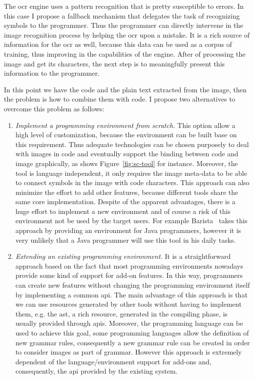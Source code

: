 The \gls{ocr} engine uses a pattern recognition that is pretty susceptible to errors. In this case I propose a fallback mechanism that delegates the task of recognizing symbols to the programmer. Thus the programmer can directly intervene in the image recognition process by helping the \gls{ocr} upon a mistake. It is a rich source of information for the \gls{ocr} as well, because this data can be used as a corpus of training, thus improving  in the capabilities of the engine. After of processing the image and get its characters, the next step is to meaningfully present this information to the programmer.

In this point we have the code and the plain text extracted from the image, then the problem is how to combine them with code. I propose two alternatives to overcome this problem as follows:

\begin{enumerate}
\item \textit{Implement a programming environment from scratch.} This option allow a high level of customization, because the environment can be built base on this requirement. Thus adequate technologies can be chosen purposely to deal with images in code and eventually support the binding between code and image graphically, as shows Figure~\ref{fig:sc-tool} for instance. Moreover, the tool is language independent, it only requires the image meta-data to be able to connect symbols in the image with code characters. This approach can also minimize the effort to add other features, because different tools share the same core implementation. Despite of the apparent advantages, there is a huge effort to implement a new environment and of course a risk of this environment not be used by the target users. For example Barista~\citep{ko2006barista} takes this approach by providing an environment for Java programmers, however it is very unlikely that a Java programmer will use this tool in his daily tasks.

\item \textit{Extending an existing programming environment.} It is a straightforward approach based on the fact that most programming environments nowadays provide some kind of support for add-on features. In this way, programmers can create new features without changing the programming environment itself by implementing a common \gls{api}. The main advantage of this approach is that we can use  resources generated by other tools without having to implement them, e.g. the \gls{ast}, a rich resource, generated in the compiling phase, is usually provided through \glspl{api}. Moreover, the programming language can be used to achieve this goal, some programming languages allow the definition of new grammar rules, consequently a new grammar rule can be created in order to consider images as part of grammar. However this approach is extremely dependent of the language/environment support for add-ons and, consequently, the \gls{api} provided by the existing system.
\end{enumerate}

